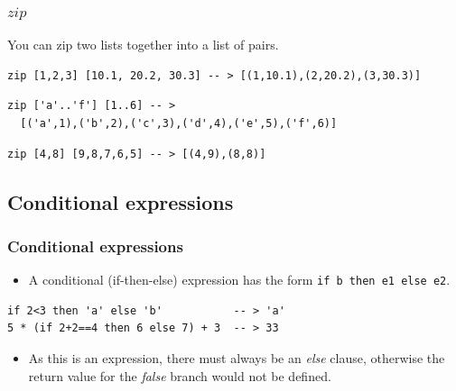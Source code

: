 \documentclass{beamer}
\begin{document}
\begin{frame}[fragile]
\frametitle{$zip$}

You can zip two lists together into a list of pairs.

\begin{verbatim}
zip [1,2,3] [10.1, 20.2, 30.3] -- > [(1,10.1),(2,20.2),(3,30.3)]
\end{verbatim}

\begin{verbatim}
zip ['a'..'f'] [1..6] -- >
  [('a',1),('b',2),('c',3),('d',4),('e',5),('f',6)]
\end{verbatim}

\begin{verbatim}
zip [4,8] [9,8,7,6,5] -- > [(4,9),(8,8)]
\end{verbatim}

\end{frame}


\subsection{Conditional expressions}

\begin{frame}[fragile]
\frametitle{Conditional expressions}

\begin{itemize}
\item A conditional (if-then-else) expression has the form \texttt{if b
  then e1 else e2}.
\end{itemize}

\begin{verbatim}
if 2<3 then 'a' else 'b'           -- > 'a'
5 * (if 2+2==4 then 6 else 7) + 3  -- > 33
\end{verbatim}

\begin{itemize}
\item As this is an expression, there must always be an \emph{else} clause, otherwise the return value for the \emph{false} branch would not be defined.
\end{itemize}

\end{frame}

\end{document}

